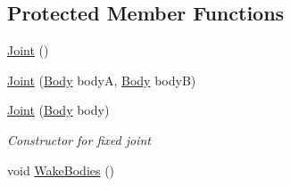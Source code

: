\subsection*{Protected Member Functions}
\begin{DoxyCompactItemize}
\item 
\hyperlink{class_farseer_physics_1_1_dynamics_1_1_joints_1_1_joint_a5e705dc70d8f4e26f83a3a19068c7d31}{Joint} ()
\item 
\hyperlink{class_farseer_physics_1_1_dynamics_1_1_joints_1_1_joint_ae9612786f85f36069ae135c65d1a5238}{Joint} (\hyperlink{class_farseer_physics_1_1_dynamics_1_1_body}{Body} body\+A, \hyperlink{class_farseer_physics_1_1_dynamics_1_1_body}{Body} body\+B)
\item 
\hyperlink{class_farseer_physics_1_1_dynamics_1_1_joints_1_1_joint_a06322542d5c95f376bc483bfc85615b6}{Joint} (\hyperlink{class_farseer_physics_1_1_dynamics_1_1_body}{Body} body)
\begin{DoxyCompactList}\small\item\em Constructor for fixed joint \end{DoxyCompactList}\item 
void \hyperlink{class_farseer_physics_1_1_dynamics_1_1_joints_1_1_joint_a7507ffbd25f098201fe8355760473752}{Wake\+Bodies} ()
\end{DoxyCompactItemize}
